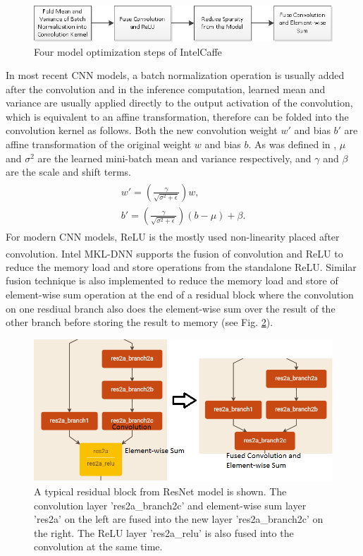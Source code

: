 \begin{figure}
  \includegraphics[width=\linewidth]{figures/model_optimization.png}
  \caption{Four model optimization steps of IntelCaffe}
  \label{fig:model_optimization}
\end{figure}

In most recent CNN models, a batch normalization operation is usually added after the convolution and in the inference computation, learned mean and variance are usually applied directly to the output activation of the convolution, which is equivalent to an affine transformation, therefore can be folded into the convolution kernel as follows. Both the new convolution weight $w'$ and bias $b'$ are affine transformation of the original weight $w$ and bias $b$. As was defined in \cite{DBLP:journals/corr/IoffeS15}, $\mu$ and $\sigma^{2}$ are the learned mini-batch mean and variance respectively, and $\gamma$ and $\beta$ are the scale and shift terms.
\begin{align*}
\begin{split}
 w'=(\frac{\gamma}{\sqrt{\sigma ^{2} +\epsilon }}) w ,
\\
 b'=(\frac{\gamma}{\sqrt{\sigma ^{2} +\epsilon }}) (b-\mu) + \beta .
\end{split}
\end{align*}
For modern CNN models, ReLU is the mostly used non-linearity placed after convolution. Intel\textsuperscript{\textregistered} MKL-DNN supports the fusion of convolution and ReLU to reduce the memory load and store operations from the standalone ReLU. Similar fusion technique is also implemented to reduce the memory load and store of element-wise sum operation at the end of a residual block where the convolution on one resdiual branch also does the element-wise sum over the result of the other branch before storing the result to memory (see Fig. \ref{fig:conv_sum_fusion}).

\begin{figure}
  \includegraphics[width=\linewidth]{figures/conv_sum_fusion.png}
  \caption{A typical residual block from ResNet model is shown. The convolution layer 'res2a\_branch2c' and element-wise sum layer 'res2a' on the left are fused into the new layer 'res2a\_branch2c' on the right. The ReLU layer 'res2a\_relu' is also fused into the convolution at the same time.}
  \label{fig:conv_sum_fusion}
\end{figure}

